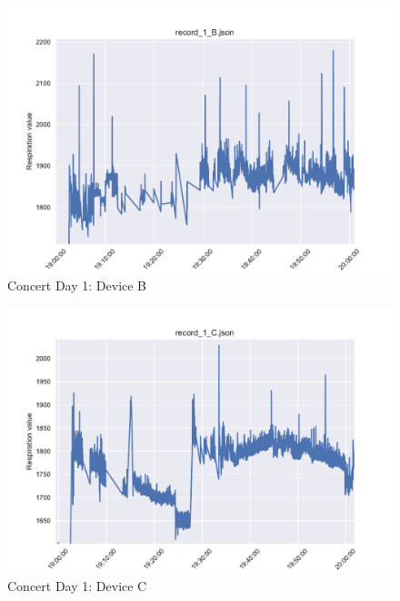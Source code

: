\begin{figure}
    \centering
    \includegraphics[scale=0.6]{images/record_1_b.pdf}
    \caption{Concert Day 1: Device B}
    \label{fig:concert_day1_b}
\end{figure}

\begin{figure}
    \centering
    \includegraphics[scale=0.6]{images/record_1_c.pdf}
    \caption{Concert Day 1: Device C}
    \label{fig:concert_day1_c}
\end{figure}

